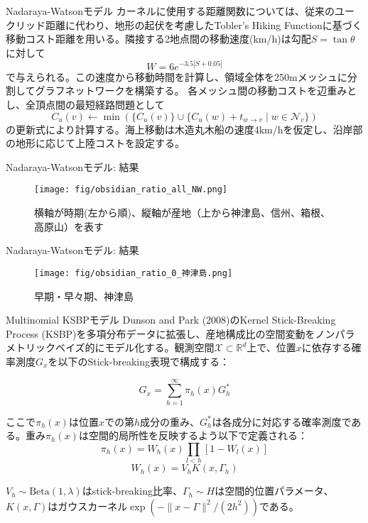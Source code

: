 \documentclass[xelatex, 8pt]{beamer}
\theoremstyle{plain}
\theoremstyle{definition}
\begin{document}
\begin{frame}{Nadaraya-Watsonモデル}
    カーネルに使用する距離関数については、従来のユークリッド距離に代わり、地形の起伏を考慮したTobler's Hiking Functionに基づく移動コスト距離を用いる。隣接する2地点間の移動速度(km/h)は勾配$S = \tan\theta$に対して
    $$W = 6e^{-3.5|S+0.05|}$$
    で与えられる。この速度から移動時間を計算し、領域全体を250mメッシュに分割してグラフネットワークを構築する。
    各メッシュ間の移動コストを辺重みとし、全頂点間の最短経路問題として
    $$C_u(v) \leftarrow \min\left(\{C_u(v)\}\cup \{C_u(w) + t_{w\rightarrow v} \mid w \in \mathcal{N}_v\}\right)$$
    の更新式により計算する。海上移動は木造丸木船の速度4km/hを仮定し、沿岸部の地形に応じて上陸コストを設定する。

\end{frame}

\begin{frame}{Nadaraya-Watsonモデル: 結果}

\begin{figure}\centering\texttt{[image: fig/obsidian\_ratio\_all\_NW.png]}\caption{横軸が時期(左から順)、縦軸が産地（上から神津島、信州、箱根、高原山）を表す}
\end{figure}

\end{frame}

\begin{frame}{Nadaraya-Watsonモデル: 結果}
\begin{figure}\centering\texttt{[image: fig/obsidian\_ratio\_0\_神津島.png]}\caption{早期・早々期、神津島}
\end{figure}
\end{frame}

\begin{frame}{Multinomial KSBPモデル}
    Dunson and Park (2008)のKernel Stick-Breaking Process (KSBP)を多項分布データに拡張し、産地構成比の空間変動をノンパラメトリックベイズ的にモデル化する。観測空間$\mathcal{X} \subset \mathbb{R}^d$上で、位置$x$に依存する確率測度$G_x$を以下のStick-breaking表現で構成する：

    $$G_x = \sum_{h=1}^{\infty} \pi_h(x) G_h^*$$

    ここで$\pi_h(x)$は位置$x$での第$h$成分の重み、$G_h^*$は各成分に対応する確率測度である。重み$\pi_h(x)$は空間的局所性を反映するよう以下で定義される：
    $$\pi_h(x) = W_h(x) \prod_{l < h} [1 - W_l(x)]$$
    $$W_h(x) = V_h K(x, \Gamma_h)$$

    $V_h \sim \text{Beta}(1, \lambda)$はstick-breaking比率、$\Gamma_h \sim H$は空間的位置パラメータ、$K(x, \Gamma)$はガウスカーネル$\exp(-\|x-\Gamma\|^2/(2h^2))$である。
\end{frame}
\end{document}
